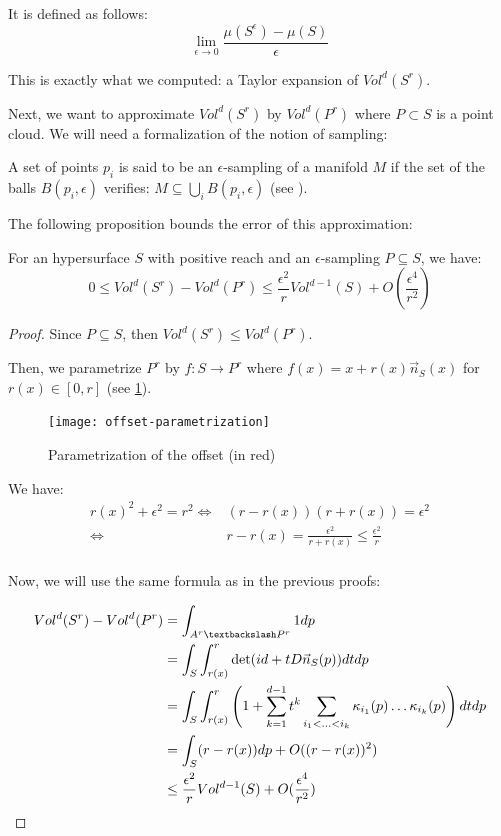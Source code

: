 It is defined as follows:
$$ \lim\limits_{\epsilon \to 0} \frac{\mu(S^{\epsilon}) - \mu(S)}{\epsilon} $$

This is exactly what we computed: a Taylor expansion of $ Vol^d(S^r) $.

Next, we want to approximate $ Vol^d(S^r) $ by $ Vol^d(P^r) $ where $ P \subset
S $ is a point cloud. We will need a formalization of the notion of sampling:

\begin{definition}
    A set of points $ p_i $ is said to be an $\epsilon$-sampling of a manifold $
    M $ if the set of the balls  $ B(p_i, \epsilon) $ verifies: $ M \subseteq
    \bigcup_i B(p_i, \epsilon) $ (see \cite{amenta1999surface}).
\end{definition}

The following proposition bounds the error of this approximation:

\begin{proposition}
    \label{prop:comp-vol-offsets}
    For an hypersurface $ S $ with positive reach and an $\epsilon$-sampling $ P
    \subseteq S $, we have:
    $$ 0 \leq Vol^d(S^r) - Vol^d(P^r) \leq \frac{\epsilon^2}{r} Vol^{d-1}(S) +
    O(\frac{\epsilon^4}{r^2}) $$
\end{proposition}

\begin{proof}
    Since $ P \subseteq S $, then $ Vol^d(S^r) \leq Vol^d(P^r) $.

    Then, we parametrize $ P^r $ by $ f : S \rightarrow P^r $ where $ f(x) = x +
    r(x) \vec{n}_S(x) $ for $ r(x) \in [0, r] $ (see
    \ref{fig:offset-parametrization}).

    \begin{figure}[h]
        \centering
        \texttt{[image: offset-parametrization]}
        \caption{Parametrization of the offset (in red)}
        \label{fig:offset-parametrization}
    \end{figure}

    We have:
    \begin{align*}
        r(x)^2 + \epsilon^2 = r^2 \iff& (r - r(x)) (r + r(x)) = \epsilon^2 \\
        \iff& r - r(x) = \frac{\epsilon^2}{r + r(x)} \leq \frac{\epsilon^2}{r} \\
    \end{align*}

    Now, we will use the same formula as in the previous proofs:

    \begin{align*}
        Vol^d(S^r) - Vol^d(P^r) &= \int_{A^r \textbackslash P^r} 1 dp \\
        &= \int_S \int_{r(x)}^r \det(id + t D \vec{n}_S(p)) dt dp \\
        &= \int_S \int_{r(x)}^r \left( 1 + \sum_{k=1}^{d-1} t^k \sum_{i_1 < \ldots
                < i_k} \kappa_{i_1}(p) \ldots \kappa_{i_k}(p) \right) dt dp \\
        &= \int_S (r - r(x)) dp + O((r - r(x))^2) \\
        &\leq \frac{\epsilon^2}{r} Vol^{d-1}(S) + O(\frac{\epsilon^4}{r^2})
    \end{align*}
\end{proof}


